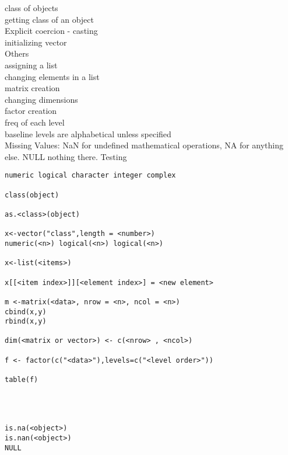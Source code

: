 \documentclass[12pt,a4paper]{report}
\begin{document}
\begin{tcolorbox}[colback=pageyl,colframe=pagebl,title= R \hfill ,coltitle=Magenta,fonttitle=\bfseries,coltext=Black,width=0.9\paperwidth,boxrule=2mm]\colorbox{pageyl}{\noindent\begin{minipage}[t]{0.3\textwidth}\sffamily \color{ctnb}\vspace{\baselineskip}
class of objects\\[\baselineskip]
getting class of an object\\[\baselineskip]
Explicit coercion - casting\\[\baselineskip]
initializing vector\\
Others\\[\baselineskip]
assigning a list\\[\baselineskip]
changing elements in a list\\[\baselineskip]
matrix creation\\[3\baselineskip]
changing dimensions\\[\baselineskip]
factor creation\\[\baselineskip]
freq of each level\\[\baselineskip]
baseline levels are alphabetical unless specified\\[\baselineskip]
Missing Values: NaN for undefined mathematical operations, NA for anything else. NULL nothing there. Testing 
\end{minipage}}\qquad\begin{minipage}[t]{0.672\textwidth}
{\begin{lstlisting}[frame=single,framerule=0pt, numbers=none, numbersep=10pt, aboveskip=20pt,belowskip=20pt]
numeric logical character integer complex

class(object)

as.<class>(object)

x<-vector("class",length = <number>)
numeric(<n>) logical(<n>) logical(<n>)

x<-list(<items>)

x[[<item index>]][<element index>] = <new element>

m <-matrix(<data>, nrow = <n>, ncol = <n>)
cbind(x,y)
rbind(x,y)

dim(<matrix or vector>) <- c(<nrow> , <ncol>)

f <- factor(c("<data>"),levels=c("<level order>"))

table(f)




is.na(<object>)
is.nan(<object>)
NULL
\end{lstlisting}}\end{minipage}\end{tcolorbox}
\end{document}
